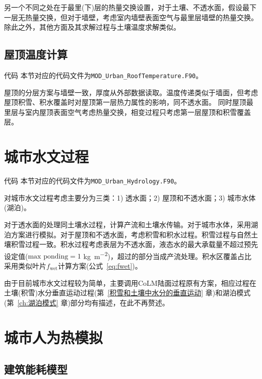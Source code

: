 另一个不同之处在于最里(下)层的热量交换设置，对于土壤、不透水面，假设最下一层无热量交换，但对于墙壁，考虑室内墙壁表面空气与最里层墙壁的热量交换。除此之外，其他方面及其求解过程与土壤温度求解类似。


\subsection{屋顶温度计算}

\begin{mymdframed}{代码}
  本节对应的代码文件为\texttt{MOD\_Urban\_RoofTemperature.F90}。
\end{mymdframed}

屋顶的分层方案与墙壁一致，厚度从外部数据读取。温度传递类似于墙面，但考虑屋顶积雪、积水覆盖时对屋顶第一层热力属性的影响，同不透水面。
同时屋顶最里层与室内屋顶表面空气考虑热量交换，相变过程只考虑第一层屋顶和积雪覆盖层。


\section{城市水文过程}

\begin{mymdframed}{代码}
  本节对应的代码文件为\texttt{MOD\_Urban\_Hydrology.F90}。
\end{mymdframed}

对城市水文过程考虑主要分为三类：1) 透水面；2) 屋顶和不透水面；3) 城市水体(湖泊)。

对于透水面的处理同土壤水过程，计算产流和土壤水传输。对于城市水体，采用湖泊方案进行模拟。对于屋顶和不透水面，考虑积雪和积水过程。积雪过程与自然土壤积雪过程一致。积水过程考虑表层为不透水面，液态水的最大承载量不超过预先设定值($\text{max ponding}=1$ \unit{kg.m^{-2}})，超过的部分当成产流处理。积水区覆盖占比采用类似叶片$f_{\mathrm{wet}}$计算方案(公式~\eqref{eq:fwet})。

由于目前城市水文过程较为简单，主要调用CoLM陆面过程原有方案，相应过程在土壤(积雪)水分垂直运动过程(第~\ref{积雪和土壤中水分的垂直运动} 章)和湖泊模式(第~\ref{ch:湖泊模式} 章)部分均有描述，在此不再赘述。


\section{城市人为热模拟}

\subsection{建筑能耗模型}\label{建筑能耗模型}

